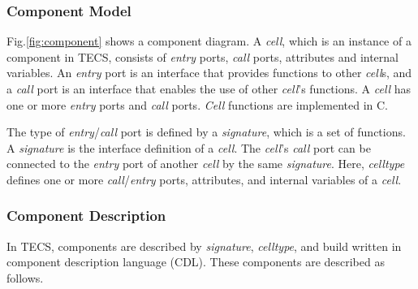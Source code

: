 \documentclass[conference]{IEEEtran/IEEEtran}
\begin{document}
\subsubsection{Component Model}

Fig.\ref{fig:component} shows a component diagram.
A {\it cell}, which is an instance of a component in TECS, consists of {\it entry} ports, {\it call} ports, attributes and internal variables.
An {\it entry} port is an interface that provides functions to other {\it cell}s, and a {\it call} port is an interface that enables the use of other {\it cell}'s functions.
A {\it cell} has one or more {\it entry} ports and {\it call} ports.
{\it Cell} functions are implemented in C.

The type of {\it entry}/{\it call} port is defined by a {\it signature}, which is a set of functions.
A {\it signature} is the interface definition of a {\it cell}.
The {\it cell}'s  {\it call} port can be connected to the {\it entry} port of another {\it cell} by the same {\it signature}.
Here, {\it celltype} defines one or more {\it call}/{\it entry} ports, attributes, and internal variables of a {\it cell}.


\subsubsection{Component Description}

In TECS, components are described by {\it signature}, {\it celltype}, and build written in component description language (CDL).
These components are described as follows.
\end{document}
